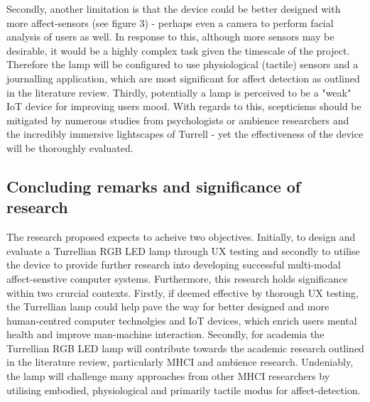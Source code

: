 \documentclass{sigchi}
\begin{document}
Secondly, another limitation is that the device could be better designed with more affect-sensors (see figure 3) - perhaps even a camera to perform facial analysis of users as well. In response to this, although more sensors may be desirable, it would be a highly complex task given the timescale of the project. Therefore the lamp will be configured to use physiological (tactile) sensors and a journalling application, which are most significant for affect detection as outlined in the literature review. Thirdly, potentially a lamp is perceived to be a "weak" IoT device for improving users mood. With regards to this, scepticisms should be mitigated by numerous studies from psychologists or ambience researchers and the incredibly immersive lightscapes of Turrell - yet the effectiveness of the device will be thoroughly evaluated.   

\subsection{Concluding remarks and significance of research}

The research proposed expects to acheive two objectives. Initially, to design and evaluate a Turrellian RGB LED lamp through UX testing and secondly to utilise the device to provide further research into developing successful multi-modal affect-senstive computer systems. Furthermore, this research holds significance within two crurcial contexts. Firstly, if deemed effective by thorough UX testing, the Turrellian lamp could help pave the way for better designed and more human-centred computer technolgies and IoT devices, which enrich users mental health and improve man-machine interaction. Secondly, for academia the Turrellian RGB LED lamp will contribute towards the academic research outlined in the literature review, particularly MHCI and ambience research. Undeniably, the lamp will challenge many approaches from other MHCI researchers by utilising embodied, physiological and primarily tactile modus for affect-detection. 
\end{document}
